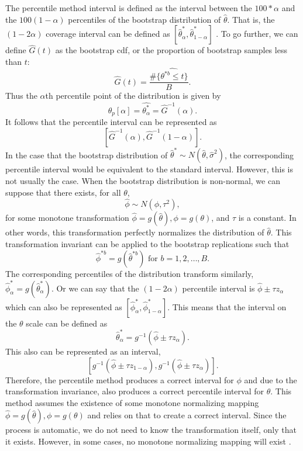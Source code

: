 \documentclass[12pt]{article}
\begin{document}
The percentile method interval is defined as the interval between the
\(100 * \alpha\) and the \(100(1 - \alpha)\) percentiles of the
bootstrap distribution of \(\hat{\theta}\). That is, the
\((1 - 2\alpha)\) coverage interval can be defined as
\([\hat{\theta}^*_\alpha,\hat{\theta}^*_{1-\alpha}]\)
\citep[\citet{EfronCasi}]{Efron86}. To go further, we can define
\(\hat{G}(t)\) as the bootstrap cdf, or the proportion of bootstrap
samples less than \(t\):
\[\hat{G}(t) = \frac{\#\{\hat{\theta^{*b} \leq t}\}}{B}.\] Thus the
\(\alpha\)th percentile point of the distribution is given by
\[\hat{\theta}_p[\alpha] = \hat{\theta^*_\alpha} = \hat{G}^{-1}(\alpha).\]
It follows that the percentile interval can be represented as
\[\left [ \hat{G}^{-1}(\alpha),\hat{G}^{-1}(1-\alpha) \right ].\] In the
case that the bootstrap distribution of
\(\hat{\theta}^* \sim N(\hat{\theta}, \hat{\sigma}^2)\), the
corresponding percentile interval would be equivalent to the standard
interval. However, this is not usually the case. When the bootstrap
distribution is non-normal, we can suppose that there exists, for all
\(\theta\), \[\hat{\phi} \sim N(\phi, \tau^2),\] for some monotone
transformation \(\hat{\phi} = g(\hat{\theta}), \phi = g(\theta)\), and
\(\tau\) is a constant. In other words, this transformation perfectly
normalizes the distribution of \(\hat{\theta}\). This transformation
invariant can be applied to the bootstrap replications such that
\[\hat{\phi}^{*b} = g\left( \hat{\theta}^{*b}\right ) \text{ for } b = 1,2,\dots, B.\]
The corresponding percentiles of the distribution transform similarly,
\(\hat{\phi}^*_\alpha = g \left ( \hat{\theta}^*_\alpha \right )\). Or
we can say that the \((1 - 2\alpha)\) percentile interval is
\(\hat{\phi} \pm \tau z_\alpha\) which can also be represented as
\([\hat{\phi}^*_\alpha,\hat{\phi}^*_{1-\alpha}]\). This means that the
interval on the \(\theta\) scale can be defined as
\[\hat{\theta}^*_\alpha = g^{-1}(\hat{\phi} \pm \tau z_\alpha).\] This
also can be represented as an interval,
\[\left [ g^{-1}(\hat{\phi} \pm \tau z_{1-\alpha}), g^{-1}(\hat{\phi} \pm \tau z_\alpha) \right ].\]
Therefore, the percentile method produces a correct interval for
\(\phi\) and due to the transformation invariance, also produces a
correct percentile interval for \(\theta\). This method assumes the
existence of some monotone normalizing mapping
\(\hat{\phi} = g(\hat{\theta}), \phi = g(\theta)\) and relies on that to
create a correct interval. Since the process is automatic, we do not
need to know the transformation itself, only that it exists. However, in
some cases, no monotone normalizing mapping will exist \citep{Efron86}.
\end{document}
